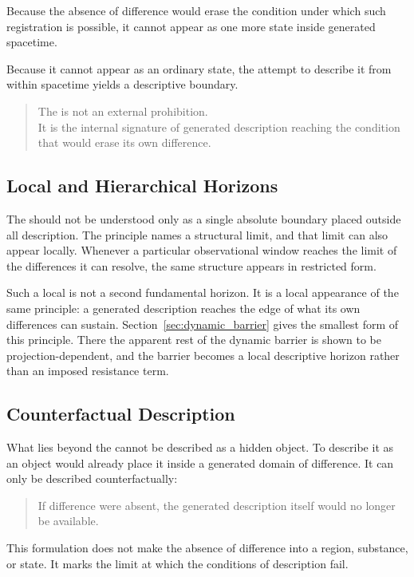 Because the absence of difference would erase the condition
under which such registration is possible,
it cannot appear as one more state inside generated spacetime.

Because it cannot appear as an ordinary state,
the attempt to describe it from within spacetime yields a
descriptive boundary.

\medskip
\begin{quote}
The \DH{} is not an external prohibition.\\
It is the internal signature of generated description
reaching the condition that would erase its own difference.
\end{quote}
\medskip

\subsection*{Local and Hierarchical Horizons}

The \DH{} should not be understood only as a single absolute boundary
placed outside all description.
The principle names a structural limit,
and that limit can also appear locally.
Whenever a particular observational window reaches the limit of the
differences it can resolve,
the same structure appears in restricted form.

Such a local \DH{} is not a second fundamental horizon.
It is a local appearance of the same principle:
a generated description reaches the edge of what its own differences
can sustain.
Section~\ref{sec:dynamic_barrier} gives the smallest form
of this principle.
There the apparent rest of the dynamic barrier is shown to be
projection-dependent,
and the barrier becomes a local descriptive horizon rather than an
imposed resistance term.

\subsection*{Counterfactual Description}

What lies beyond the \DH{} cannot be described as a hidden object.
To describe it as an object would already place it inside a generated
domain of difference.
It can only be described counterfactually:

\medskip
\begin{quote}
If difference were absent,
the generated description itself would no longer be available.
\end{quote}
\medskip

This formulation does not make the absence of difference into a region,
substance, or state.
It marks the limit at which the conditions of description fail.

